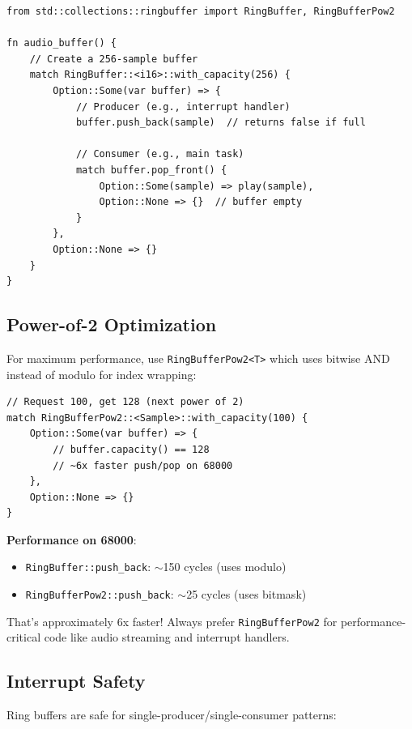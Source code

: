 \begin{lstlisting}
from std::collections::ringbuffer import RingBuffer, RingBufferPow2

fn audio_buffer() {
    // Create a 256-sample buffer
    match RingBuffer::<i16>::with_capacity(256) {
        Option::Some(var buffer) => {
            // Producer (e.g., interrupt handler)
            buffer.push_back(sample)  // returns false if full

            // Consumer (e.g., main task)
            match buffer.pop_front() {
                Option::Some(sample) => play(sample),
                Option::None => {}  // buffer empty
            }
        },
        Option::None => {}
    }
}
\end{lstlisting}

\subsection{Power-of-2 Optimization}

For maximum performance, use \texttt{RingBufferPow2<T>} which uses bitwise AND instead of modulo for index wrapping:

\begin{lstlisting}
// Request 100, get 128 (next power of 2)
match RingBufferPow2::<Sample>::with_capacity(100) {
    Option::Some(var buffer) => {
        // buffer.capacity() == 128
        // ~6x faster push/pop on 68000
    },
    Option::None => {}
}
\end{lstlisting}

\begin{tipbox}
\textbf{Performance on 68000}:
\begin{itemize}
    \item \texttt{RingBuffer::push\_back}: $\sim$150 cycles (uses modulo)
    \item \texttt{RingBufferPow2::push\_back}: $\sim$25 cycles (uses bitmask)
\end{itemize}
That's approximately 6x faster! Always prefer \texttt{RingBufferPow2} for performance-critical code like audio streaming and interrupt handlers.
\end{tipbox}

\subsection{Interrupt Safety}

Ring buffers are safe for single-producer/single-consumer patterns:

